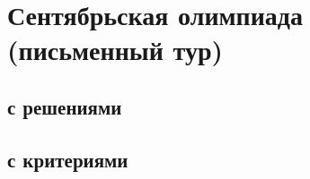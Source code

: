\newcommand\olympiadsolution[1]{\ifolympiadsolutions#1\fi}
\newcommand\olympiadcriterion[1]{\ifolympiadcriteria#1\fi}

\section*{Сентябрьская олимпиада (письменный тур)}

\olympiadsolution{\subsection*{с решениями}}
\olympiadcriterion{\subsection*{с критериями}}


